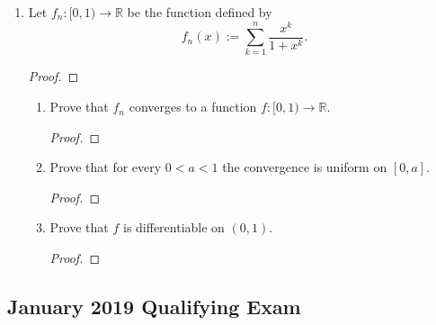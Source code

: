 \documentclass[reqno]{article}
\theoremstyle{remark}
\numberwithin{equation}{section}
\newcommand{\R}{\mathbb{R}}
\begin{document}
\begin{enumerate}
\begin{proof}
    \end{proof}

\item Let $f_n \colon [0,1) \to \R$ be the function defined by $$f_n(x):= \sum_{k=1}^n \frac{x^k}{1+x^k}.$$
	\begin{proof}
    
    \end{proof}

\begin{enumerate}

\item[(a)] Prove that $f_n$ converges to a function $f \colon [0,1) \to \R$. 
	\begin{proof}
    
    \end{proof}

\item[(b)] Prove that for every $0 < a < 1$ the convergence is uniform on $[0,a]$. 
	\begin{proof}
    
    \end{proof}

\item[(c)] Prove that $f$ is differentiable on $(0,1)$. 
	\begin{proof}
    
    \end{proof}

\end{enumerate} 

\end{enumerate} 

\subsection*{January 2019 Qualifying Exam}
\end{document}
